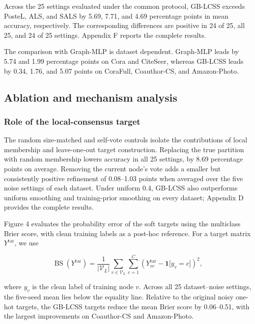 \documentclass[preprint,12pt]{elsarticle}
\begin{document}
Across the 25 settings evaluated under the common protocol, GB-LCSS exceeds PosteL, ALS, and SALS by 5.69, 7.71, and 4.69 percentage points in mean accuracy, respectively. The corresponding differences are positive in 24 of 25, all 25, and 24 of 25 settings. Appendix F reports the complete results.

The comparison with Graph-MLP is dataset dependent. Graph-MLP leads by 5.74 and 1.99 percentage points on Cora and CiteSeer, whereas GB-LCSS leads by 0.34, 1.76, and 5.07 points on CoraFull, Coauthor-CS, and Amazon-Photo.

\subsection{Ablation and mechanism analysis}\label{sec:5.3}

\subsubsection{Role of the local-consensus target}\label{sec:5.3.1}

The random size-matched and self-vote controls isolate the contributions of local membership and leave-one-out target construction. Replacing the true partition with random membership lowers accuracy in all 25 settings, by 8.69 percentage points on average. Removing the current node's vote adds a smaller but consistently positive refinement of 0.08--1.03 points when averaged over the five noise settings of each dataset. Under uniform 0.4, GB-LCSS also outperforms uniform smoothing and training-prior smoothing on every dataset; Appendix D provides the complete results.

Figure 4 evaluates the probability error of the soft targets using the multiclass Brier score, with clean training labels as a post-hoc reference. For a target matrix \(Y^{\mathrm{tar}}\), we use

\[
\operatorname{BS}(Y^{\mathrm{tar}}) = \frac{1}{|\mathcal{V}_{L}|}\sum_{v \in \mathcal{V}_{L}}{\sum_{c = 1}^{C}\left( Y_{vc}^{\mathrm{tar}} - \mathbf{1}\lbrack y_{v} = c\rbrack \right)^{2}},
\]

where \(y_{v}\) is the clean label of training node \(v\). Across all 25 dataset--noise settings, the five-seed mean lies below the equality line. Relative to the original noisy one-hot targets, the GB-LCSS targets reduce the mean Brier score by 0.06--0.51, with the largest improvements on Coauthor-CS and Amazon-Photo.
\end{document}
